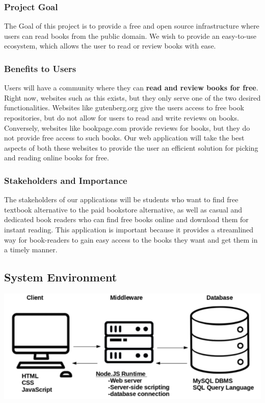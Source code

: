 \documentclass[letter, 12pt, titlepage]{article}
\begin{document}
\subsubsection{Project Goal}
The Goal of this project is to provide a free and open source infrastructure where users can read books from the public domain. We wish to provide an easy-to-use ecosystem, which allows the user to read or review books with ease.
\subsubsection{Benefits to Users}
Users will have a community where they can \textbf{read and review books for free}. Right now, websites such as this exists, but they only serve one of the two desired functionalities. Websites like gutenberg.org give the users access to free book repositories, but do not allow for users to read and write reviews on books. Conversely, websites like bookpage.com provide reviews for books, but they do not provide free access to such books. Our web application will take the best aspects of both these websites to provide the user an efficient solution for picking and reading online books for free.
\subsubsection{Stakeholders and Importance}
The stakeholders of our applications will be students who want to find free textbook alternative to the paid bookstore alternative, as well as casual and dedicated book readers who can find free books online and download them for instant reading. This application is important because it provides a streamlined way for book-readers to gain easy access to the books they want and get them in a timely manner.


\subsection{System Environment}

\includegraphics[scale=.66]{3-tier.png}
\end{document}

